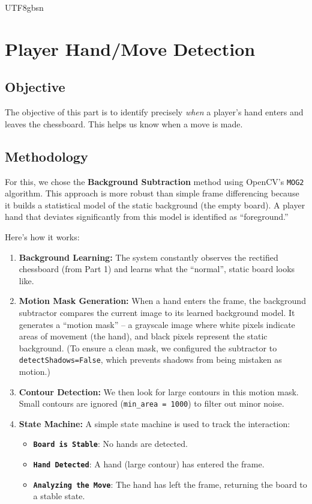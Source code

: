 \documentclass[12pt]{report}
\begin{document}
\begin{CJK*}{UTF8}{gbsn}
\section{Player Hand/Move Detection}

\subsection{Objective}

The objective of this part is to identify precisely \textit{when} a player's hand enters and leaves the chessboard. This helps us know when a move is made.

\subsection{Methodology}

For this, we chose the \textbf{Background Subtraction} method using OpenCV's \texttt{MOG2} algorithm. This approach is more robust than simple frame differencing because it builds a statistical model of the static background (the empty board). A player hand that deviates significantly from this model is identified as ``foreground.''

Here's how it works:
\begin{enumerate}
    \item \textbf{Background Learning:} The system constantly observes the rectified chessboard (from Part 1) and learns what the ``normal'', static board looks like.
    \item \textbf{Motion Mask Generation:} When a hand enters the frame, the background subtractor compares the current image to its learned background model. It generates a ``motion mask'' -- a grayscale image where white pixels indicate areas of movement (the hand), and black pixels represent the static background. 
    (To ensure a clean mask, we configured the subtractor to \texttt{detectShadows=False}, which prevents shadows from being mistaken as motion.)
    \item \textbf{Contour Detection:} We then look for large contours in this motion mask. Small contours are ignored (\texttt{min\_area = 1000}) to filter out minor noise.
    \item \textbf{State Machine:} A simple state machine is used to track the interaction:
    \begin{itemize}
        \item \textbf{\texttt{Board is Stable}}: No hands are detected.
        \item \textbf{\texttt{Hand Detected}}: A hand (large contour) has entered the frame.
        \item \textbf{\texttt{Analyzing the Move}}: The hand has left the frame, returning the board to a stable state.
    \end{itemize}
\end{enumerate}



\end{CJK*}
\end{document}

